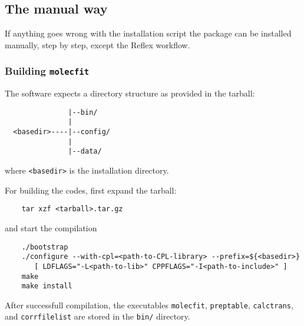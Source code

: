 
\subsection{The manual way}\label{sec:manualway}
If anything goes wrong with the installation script the package can be
installed manually, step by step, except the Reflex workflow.

\subsubsection{Building {\tt molecfit}}\label{sec:building}
The software expects a directory structure as provided in the tarball:
\begin{verbatim}
               |--bin/
               |
  <basedir>----|--config/
               |
               |--data/
\end{verbatim}
where {\tt <basedir>} is the installation directory.

For building the codes, first expand the tarball:
\begin{verbatim}
    tar xzf <tarball>.tar.gz
\end{verbatim}
and start the compilation
\begin{verbatim}
    ./bootstrap
    ./configure --with-cpl=<path-to-CPL-library> --prefix=${<basedir>}
       [ LDFLAGS="-L<path-to-lib>" CPPFLAGS="-I<path-to-include>" ]
    make
    make install
\end{verbatim}
After successfull compilation, the executables {\tt molecfit}, {\tt preptable},
{\tt calctrans}, and {\tt corrfilelist} are stored in the \verb|bin/|
directory.

